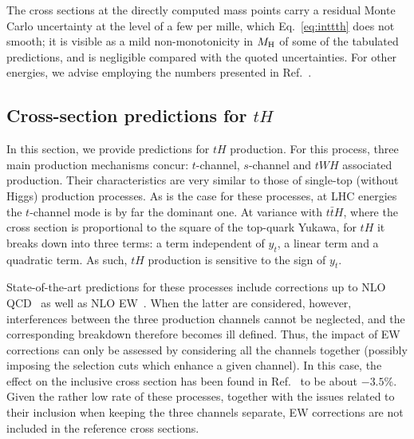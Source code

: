 The cross sections at the directly computed mass points carry a residual Monte Carlo
uncertainty at the level of a few per mille, which Eq.~\eqref{eq:inttth} does not smooth;
it is visible as a mild non-monotonicity in $M_\mathrm{H}$ of some of the tabulated predictions,
and is negligible compared with the quoted uncertainties.
For other energies, we advise employing the numbers
presented in Ref.~\cite{Karlberg:2024zxx}.



\subsection{Cross-section predictions for \texorpdfstring{$t H$}{tH}}
\label{sec:results-xsects-singleth}
In this section, we provide predictions for $tH$ production. 
For this process, three main production mechanisms concur: 
$t$-channel, $s$-channel and $tWH$ associated production. Their characteristics are very similar to those of single-top (without Higgs) production processes. As is the case
for these processes, at LHC energies the $t$-channel mode is by far the dominant one. At variance with $t\bar tH$, where the cross section
is proportional to the square of the top-quark Yukawa, for $tH$ it breaks down into three terms: a term independent of $y_t$, a linear term and a quadratic
term. As such, $tH$ production is sensitive to the sign of $y_t$. 

State-of-the-art predictions
for these processes include corrections up to NLO QCD~\cite{Demartin:2015uha,Demartin:2016axk} as well as NLO EW~\cite{Pagani:2020mov}. When
the latter are considered, however, interferences between the three production channels cannot be neglected, and the corresponding breakdown 
therefore becomes ill defined. Thus, the impact of EW corrections can only be assessed
by considering all the channels together (possibly imposing the selection cuts which enhance a given channel). In this case, the effect on the inclusive
cross section has been found in Ref.~\cite{Pagani:2020mov} to be about $-3.5\%$. Given the rather low rate of these processes, together with
the issues related to their inclusion when keeping the three channels separate, EW
corrections are not included in the reference cross sections.\\

